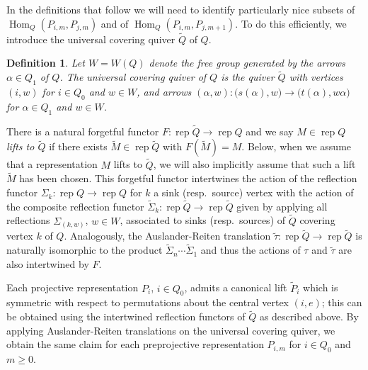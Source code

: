 \documentclass{amsart}
\newtheorem{definition}[theorem]{Definition}
\numberwithin{equation}{section}
\newcommand{\Hom}{\operatorname{Hom}}
\newcommand{\rep}{\operatorname{rep}}
\begin{document}
In the definitions that follow we will need to identify particularly nice subsets of $\Hom_Q(P_{i,m},P_{j,m})$ and of $\Hom_Q(P_{i,m},P_{j,m+1})$.
To do this efficiently, we introduce the universal covering quiver $\widetilde{Q}$ of $Q$.
\begin{definition}
  Let $W=W(Q)$ denote the free group generated by the arrows $\alpha\in Q_1$ of $Q$.
  The \emph{universal covering quiver} of $Q$ is the quiver $\widetilde{Q}$ with vertices $(i,w)$ for $i\in Q_0$ and $w\in W$, and arrows $(\alpha,w):\big(s(\alpha),w\big)\to \big(t(\alpha),w \alpha \big)$ for $\alpha\in Q_1$ and $w\in W$.
\end{definition}
There is a natural forgetful functor $F:\rep\widetilde{Q}\to\rep Q$ and we say $M\in\rep Q$ \emph{lifts to $\widetilde{Q}$} if there exists $\widetilde{M}\in\rep\widetilde{Q}$ with $F(\widetilde{M})=M$.
Below, when we assume that a representation $M$ lifts to $\widetilde{Q}$, we will also implicitly assume that such a lift $\widetilde{M}$ has been chosen.
This forgetful functor intertwines the action of the reflection functor $\Sigma_k:\rep Q\to\rep Q$ for $k$ a sink (resp.~source) vertex with the action of the composite reflection functor $\widetilde{\Sigma}_k:\rep\widetilde{Q}\to\rep\widetilde{Q}$ given by applying all reflections $\Sigma_{(k,w)}$, $w\in W$, associated to sinks (resp.~sources) of $\widetilde{Q}$ covering vertex $k$ of $Q$.
Analogously, the Auslander-Reiten translation $\tilde\tau:\rep\widetilde{Q}\to\rep\widetilde{Q}$ is naturally isomorphic to the product $\widetilde{\Sigma}_n\cdots\widetilde{\Sigma}_1$ and thus the actions of $\tau$ and $\tilde{\tau}$ are also intertwined by $F$. 

Each projective representation $P_i$, $i\in Q_0$, admits a canonical lift $\widetilde{P}_i$ which is symmetric with respect to permutations about the central vertex $(i,e)$; this can be obtained using the intertwined reflection functors of $\widetilde{Q}$ as described above.
By applying Auslander-Reiten translations on the universal covering quiver, we obtain the same claim for each preprojective representation $P_{i,m}$ for $i\in Q_0$ and $m\ge0$.
\end{document}
